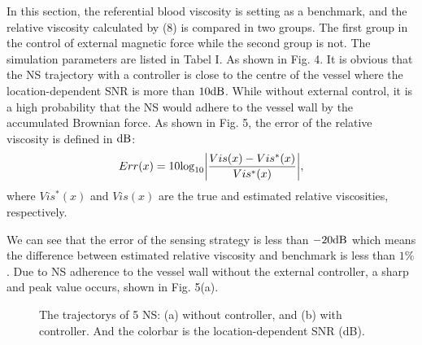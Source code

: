 \documentclass[conference]{IEEEtran}
\begin{document}
In this section, the referential blood viscosity is setting as a benchmark, and the relative viscosity calculated by (8) is compared in two groups. The first group in the control of external magnetic force while the second group is not. The simulation parameters are listed in Tabel I. As shown in Fig. 4. It is obvious that the NS trajectory with a controller is close to the centre of the vessel where the location-dependent SNR is more than $10 \rm dB$. While without external control, it is a high probability that the NS would adhere to the vessel wall by the accumulated Brownian force. As shown in Fig. 5, the error of the relative viscosity is defined in $\rm dB$: 
\begin{equation}
\label{eq12}
Err(x)=10{\rm log}_{10}{\left| \frac{ Vis(x) - Vis^{*}(x) }{ Vis^{*}(x) }\right|},
\end{equation}
where $Vis^{*}(x)$ and $Vis(x)$ are the true and estimated relative viscosities, respectively. 

We can see that the error of the sensing strategy is less than $-20 \rm dB$ which means the difference between estimated relative viscosity and benchmark is less than $1\%$.  Due to NS adherence to the vessel wall without the external controller, a sharp and peak value occurs,  shown in Fig. 5(a).


\begin{figure}[htbp]
\centering

%

%

\centering
\caption{The trajectorys of 5 NS: (a) without controller, and (b) with controller. And the colorbar is the location-dependent SNR (dB).}
\label {fig3}
\end{figure}
\end{document}
